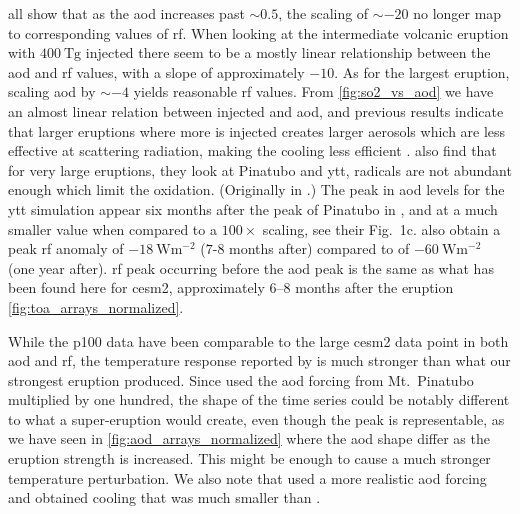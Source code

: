 \documentclass{ametsocV5}
\newcommand{\iso}[1][i]{{#1}njected \ce{SO2}}
\begin{document}
all show that as the \ac{aod} increases past \(\sim 0.5\), the scaling of \(\sim -20\)
no longer map to corresponding values of \ac{rf}. When looking at the intermediate
volcanic eruption with \(\SI{400}{\tera\gram}\) \iso{} there seem to be a mostly linear
relationship between the \ac{aod} and \ac{rf} values, with a slope of approximately
\(-10\). As for the largest eruption, scaling \ac{aod} by \(\sim-4\) yields reasonable
\ac{rf} values. From \cref{fig:so2_vs_aod} we have an almost linear relation between
\iso{} and \ac{aod}, and previous results indicate that larger eruptions where more
 is injected creates larger aerosols which are less effective at scattering
radiation, making the cooling less efficient
\citep{english2013,timmreck2010,timmreck2018}. \citet{timmreck2010} also find that for
very large eruptions, they look at Pinatubo and \ac{ytt},  radicals are not
abundant enough which limit the  oxidation. (Originally in \citep{bekki1995}.)
The peak in \ac{aod} levels for the \ac{ytt} simulation appear six months after the peak
of Pinatubo in \citet{timmreck2010}, and at a much smaller value when compared to a
\(100\times\) scaling, see their Fig.\ 1c. \citet{timmreck2010} also obtain a peak
\ac{rf} anomaly of \(\SI{-18}{\watt\metre^{-2}}\) (\(7\)-\(8\) months after) compared to
\citet{jones2005} of \(\SI{-60}{\watt\metre^{-2}}\) (one year after). \ac{rf} peak
occurring before the \ac{aod} peak is the same as what has been found here for
\ac{cesm2}, approximately \(6\)--\(8\) months after the eruption
\cref{fig:toa_arrays_normalized}.

While the \ac{p100} data have been comparable to the large \ac{cesm2} data point in both
\ac{aod} and \ac{rf}, the temperature response reported by \citet{jones2005} is much
stronger than what our strongest eruption produced. Since \citet{jones2005} used the
\ac{aod} forcing from Mt.\ Pinatubo multiplied by one hundred, the shape of the time
series could be notably different to what a super-eruption would create, even though the
peak is representable, as we have seen in \cref{fig:aod_arrays_normalized} where the
\ac{aod} shape differ as the eruption strength is increased. This might be enough to
cause a much stronger temperature perturbation. We also note that \citet{timmreck2010}
used a more realistic \ac{aod} forcing and obtained cooling that was much smaller than
\citet{jones2005}.
\end{document}
